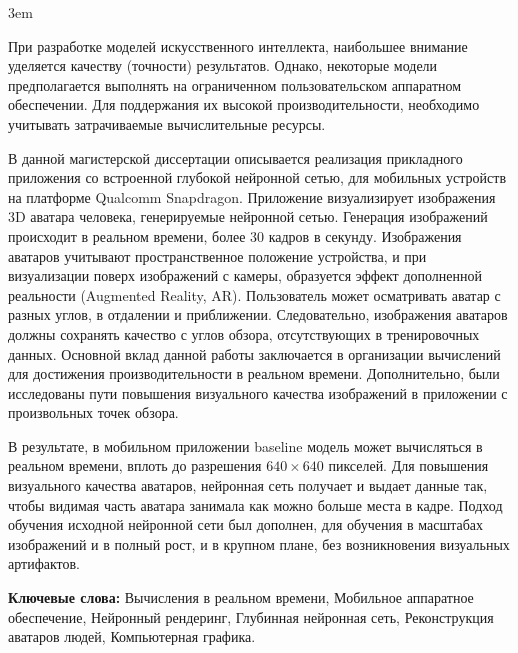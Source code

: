 \emergencystretch 3em
\par
При разработке моделей искусственного интеллекта, наибольшее внимание уделяется качеству (точности) результатов. Однако, некоторые модели предполагается выполнять на ограниченном пользовательском аппаратном обеспечении. Для поддержания их высокой производительности, необходимо учитывать затрачиваемые вычислительные ресурсы.

\par
В данной магистерской диссертации описывается реализация прикладного приложения со встроенной глубокой нейронной сетью, для мобильных устройств на платформе Qualcomm Snapdragon. Приложение визуализирует изображения 3D аватара человека, генерируемые нейронной сетью. Генерация изображений происходит в реальном времени, более 30 кадров в секунду. Изображения аватаров учитывают пространственное положение устройства, и при визуализации поверх изображений с камеры, образуется эффект дополненной реальности (Augmented Reality, AR). Пользователь может осматривать аватар с разных углов, в отдалении и приближении. Следовательно, изображения аватаров должны сохранять качество с углов обзора, отсутствующих в тренировочных данных. Основной вклад данной работы заключается в организации вычислений для достижения производительности в реальном времени. Дополнительно, были исследованы пути повышения визуального качества изображений в приложении с произвольных точек обзора.	

\par
В результате, в мобильном приложении baseline модель \cite{dnn:stylepeople21} может вычисляться в реальном времени, вплоть до разрешения $640\times640$ пикселей. Для повышения визуального качества аватаров, нейронная сеть получает и выдает данные так, чтобы видимая часть аватара занимала как можно больше места в кадре. Подход обучения исходной нейронной сети был дополнен, для обучения в масштабах изображений и в полный рост, и в крупном плане, без возникновения визуальных артифактов. 

\par
\textbf{Ключевые слова:} Вычисления в реальном времени, Мобильное аппаратное обеспечение, Нейронный рендеринг, Глубинная нейронная сеть, Реконструкция аватаров людей, Компьютерная графика.  

